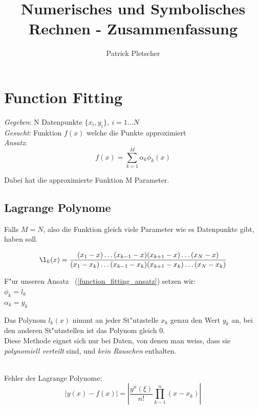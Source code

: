 \documentclass[german, 10pt, a4paper, twocolumn]{scrartcl}
\title{Numerisches und Symbolisches Rechnen - Zusammenfassung}
\author{Patrick Pletscher}
\begin{document}
\maketitle

\section{Function Fitting}

\textit{Gegeben}: N Datenpunkte $\{x_i,y_i\},\:i=1\ldots N$\\
\textit{Gesucht}: Funktion $f(x)$ welche die Punkte approximiert\\
\textit{Ansatz}:
\begin{equation}
 f(x)=\sum^M_{k=1}\alpha_k\phi_k(x)
 \label{function_fitting_ansatz}
\end{equation}

Dabei hat die approximierte Funktion M Parameter.

\subsection{Lagrange Polynome}


Falls $M=N$, also die Funktion gleich viele Parameter wie es Datenpunkte gibt, haben soll.

\begin{displaymath}
	\l_k(x)=\frac{(x_1-x)\ldots(x_{k-1}-x)(x_{k+1}-x)\ldots(x_N-x)}{(x_1-x_k)\ldots(x_{k-1}-x_k)(x_{k+1}-x_k)\ldots(x_N-x_k)}
\end{displaymath}

F"ur unseren Ansatz ~(\ref{function_fitting_ansatz}) setzen wir:\\
$\phi_k=l_k$\\
$\alpha_k=y_k$


Das Polynom $l_k(x)$ nimmt an jeder St"utzstelle $x_k$ genau den Wert $y_k$ an, bei den anderen St"utzstellen ist das Polynom gleich 0.\\
Diese Methode eignet sich nur bei Daten, von denen man weiss, dass sie \textit{polynomiell verteilt} sind, und \textit{kein Rauschen} enthalten.\\\\


Fehler der Lagrange Polynome:
\begin{displaymath}
	|y(x)-f(x)|=|\frac{y^n(\xi)}{n!}\prod^n_{k-1}(x-x_k)|
\end{displaymath}
\end{document}
